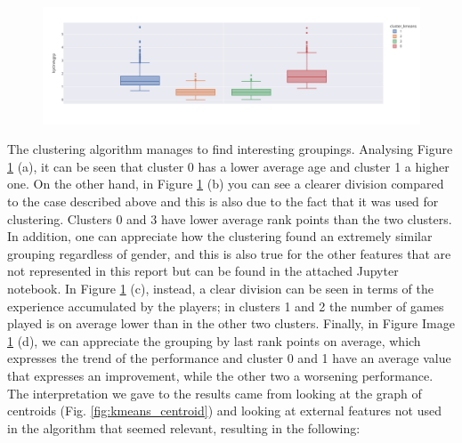 \begin{figure}[!h]
\begin{minipage}{.45\textwidth}
		\label{fig:total_match_played_kmeans}
	\end{minipage}%
	\begin{minipage}{.45\textwidth}
		\centering
		\includegraphics[width=\textwidth]{plots/kmeans/kmeans-box-plot-lrponavgrp.png}
		\label{fig:lrpOnAvgrp_kmeans}
	\end{minipage}
	\label{fig:kmeans_distributions}
\end{figure}
The clustering algorithm manages to find interesting groupings. Analysing Figure \ref{fig:kmeans_distributions} (a), it can be seen that cluster 0 has a lower average age and cluster 1 a higher one. 
On the other hand, in Figure \ref{fig:kmeans_distributions} (b) you can see a clearer division compared to the case described above and this is also due to the fact that it was used for clustering. Clusters 0 and 3 have lower average rank points than the two clusters. In addition, one can appreciate how the clustering found an extremely similar grouping regardless of gender, and this is also true for the other features that are not represented in this report but can be found in the attached Jupyter notebook.
In Figure \ref{fig:kmeans_distributions} (c), instead, a clear division can be seen in terms of the experience accumulated by the players; in clusters 1 and 2 the number of games played is on average lower than in the other two clusters. 
Finally, in Figure Image \ref{fig:kmeans_distributions} (d), we can appreciate the grouping by last rank points on average, which expresses the trend of the performance and cluster 0 and 1 have an average value that expresses an improvement, while the other two a worsening performance.
\\
The interpretation we gave to the results came from looking at the graph of centroids (Fig. \ref{fig:kmeans_centroid}) and looking at external features not used in the algorithm that seemed relevant, resulting in the following:
